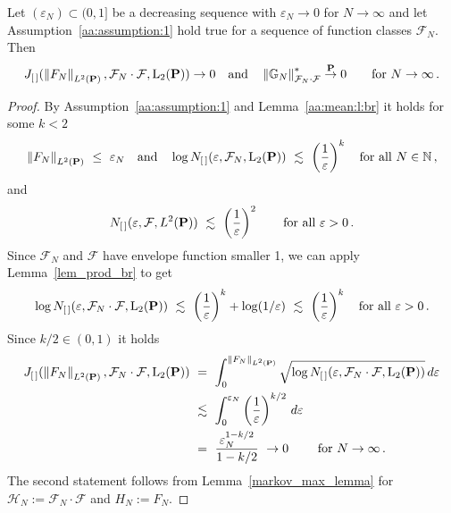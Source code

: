 \begin{lemma}
  \label{aa:r3:lemma:1}
  Let
$(\varepsilon_N)\subset(0,1]$
be 
a decreasing sequence
with $\varepsilon_N\to 0$ for $N\to\infty$ 
and let Assumption~\ref{aa:assumption:1} hold true
for a sequence of function classes $\mathcal{F}_N$.
Then
\begin{gather*}
  J_{[\,]}(
\norm{F_N}_{L^2(\P)}
,\mathcal{F}_N\cdot\mathcal{F},\mathrm{L}_2(\P))
  \to 0
  \quad
  \text{and}
  \quad
  \norm{\G_N}^*_{\mathcal{F}_N\cdot\mathcal{F}}\overset{\P}{\to}0
  \qquad
  \text{for}\ 
  N\to\infty
  \,.
\end{gather*}
\end{lemma}
\begin{proof}
  By Assumption~\ref{aa:assumption:1}
  and Lemma~\ref{aa:mean:l:br} it holds
for some $k<2$
\begin{gather*}
\norm{F_N}_{L^2(\P)}
\ 
\le
\ 
\varepsilon_N
\quad
\text{and}
\quad
  \log
  N_{[\,]}(\varepsilon,\mathcal{F}_N,\mathrm{L}_2(\P))
  \ 
  \lesssim
  \ 
  \left( 
  \frac{1}{\varepsilon}
  \right)^k
  \quad
  \text{for all}
  \ 
  N\in\mathbb{N}
  \,,
\end{gather*}
and
  \begin{gather*}
    N_{[\,]}
    (
    \varepsilon
    ,
    \mathcal{F}, L^2(\P))
    \ 
    \lesssim
    \ 
    \left( 
      \frac{1}{\varepsilon}
    \right)^2
    \qquad
    \text{for all}
    \ 
    \varepsilon>0
    \,.
  \end{gather*}
  Since $\mathcal{F}_N$ and $\mathcal{F}$ have envelope function smaller 1, we can apply Lemma~\ref{lem_prod_br} to get
  \begin{gather*}
  \log
  N_{[\,]}(\varepsilon,\mathcal{F}_N\cdot\mathcal{F},\mathrm{L}_2(\P))
  \ 
  \lesssim
  \ 
  \left( 
  \frac{1}{\varepsilon}
  \right)^k
  +
  \log
  (1/\varepsilon)
  \ 
  \lesssim
  \ 
  \left( 
  \frac{1}{\varepsilon}
  \right)^k
  \quad
  \text{for all}\ 
  \varepsilon>0
  \,.
  \end{gather*}
  Since 
  $k/2\in(0,1)$
  it holds
\begin{align*}
  J_{[\,]}(
\norm{F_N}_{L^2(\P)}
,\mathcal{F}_N\cdot\mathcal{F},\mathrm{L}_2(\P))
  &
  \ 
=
  \ 
\int_0^{
\norm{F_N}_{L^2(\P)}
}
\sqrt{
  \log
  N_{[\,]}(\varepsilon,\mathcal{F}_N\cdot\mathcal{F},\mathrm{L}_2(\P))
}
\,d\varepsilon
\\
&
\ 
\lesssim
\ 
\int_0^{
  \varepsilon_N
}
  \left( 
  \frac{1}{\varepsilon}
\right)^{k/2}
\,d\varepsilon
\\
&
\ 
=
\ 
\frac{
\varepsilon_N^{1-k/2}
}{1-k/2}
\ 
\to 0
\ 
\qquad
\text{for}
\ 
N\to\infty
\,.
\end{align*}
The second statement follows from Lemma~\ref{markov_max_lemma}
for 
$\mathcal{H}_N:=\mathcal{F}_N\cdot\mathcal{F}$ and
$H_N:=F_N$.
\end{proof}

